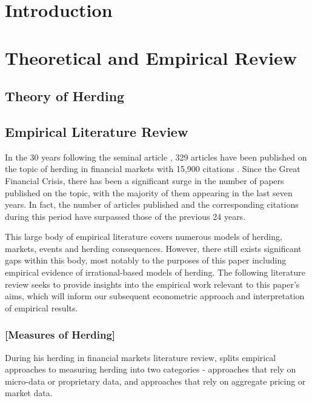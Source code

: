 \documentclass[12pt]{article}
\numberwithin{table}{section}   %
\begin{document}


\tableofcontents

\break

\section{Introduction}

\break

\section{Theoretical and Empirical Review}

\subsection{Theory of Herding}



\subsection{Empirical Literature Review}

In the 30 years following the seminal article \citet{scharfstein}, 329 articles have been published on the topic of herding in financial markets with 15,900 citations \citep{choijil}. Since the Great Financial Crisis, there has been a significant surge in the number of papers published on the topic, with the majority of them appearing in the last seven years. In fact, the number of articles published and the corresponding citations during this period have surpassed those of the previous 24 years.

This large body of empirical literature covers numerous models of herding, markets, events and herding consequences. However, there still exists significant gaps within this body, most notably to the purposes of this paper including empirical evidence of irrational-based models of herding. The following literature review seeks to provide insights into the empirical work relevant to this paper’s aims, which will inform our subsequent econometric approach and interpretation of empirical results.

\subsubsection*{[Measures of Herding]} 

During his herding in financial markets literature review, \citet{spyrou} splits empirical approaches to measuring herding into two categories - approaches that rely on micro-data or proprietary data, and approaches that rely on aggregate pricing or market data.
\end{document}
